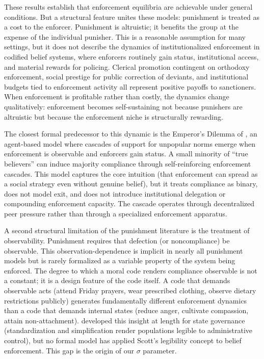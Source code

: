 \documentclass[12pt]{article}
\begin{document}
These results establish that enforcement equilibria are achievable under general conditions. But a structural feature unites these models: punishment is treated as a cost to the enforcer. Punishment is altruistic; it benefits the group at the expense of the individual punisher. This is a reasonable assumption for many settings, but it does not describe the dynamics of institutionalized enforcement in codified belief systems, where enforcers routinely gain status, institutional access, and material rewards for policing. Clerical promotion contingent on orthodoxy enforcement, social prestige for public correction of deviants, and institutional budgets tied to enforcement activity all represent positive payoffs to sanctioners. When enforcement is profitable rather than costly, the dynamics change qualitatively: enforcement becomes self-sustaining not because punishers are altruistic but because the enforcement niche is structurally rewarding.

The closest formal predecessor to this dynamic is the Emperor's Dilemma of \citet{centola2005}, an agent-based model where cascades of support for unpopular norms emerge when enforcement is observable and enforcers gain status. A small minority of ``true believers'' can induce majority compliance through self-reinforcing enforcement cascades. This model captures the core intuition (that enforcement can spread as a social strategy even without genuine belief), but it treats compliance as binary, does not model exit, and does not introduce institutional delegation or compounding enforcement capacity. The cascade operates through decentralized peer pressure rather than through a specialized enforcement apparatus.

A second structural limitation of the punishment literature is the treatment of observability. Punishment requires that defection (or noncompliance) be observable. This observation-dependence is implicit in nearly all punishment models but is rarely formalized as a variable property of the system being enforced. The degree to which a moral code renders compliance observable is not a constant; it is a design feature of the code itself. A code that demands observable acts (attend Friday prayers, wear prescribed clothing, observe dietary restrictions publicly) generates fundamentally different enforcement dynamics than a code that demands internal states (reduce anger, cultivate compassion, attain non-attachment). \citet{scott1998} developed this insight at length for state governance (standardization and simplification render populations legible to administrative control), but no formal model has applied Scott's legibility concept to belief enforcement. This gap is the origin of our $\sigma$ parameter.
\end{document}
